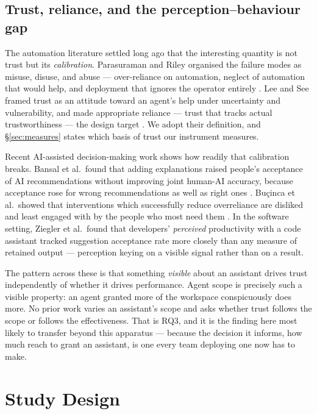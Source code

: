 \documentclass[acmsmall,review,screen]{acmart}
\begin{document}
\subsection{Trust, reliance, and the perception--behaviour gap}

The automation literature settled long ago that the interesting quantity is not
trust but its \emph{calibration}. Parasuraman and Riley organised the failure
modes as misuse, disuse, and abuse --- over-reliance on automation, neglect of
automation that would help, and deployment that ignores the operator entirely
\cite{parasuraman1997humans}. Lee and See framed trust as an attitude toward an
agent's help under uncertainty and vulnerability, and made appropriate reliance
--- trust that tracks actual trustworthiness --- the design target
\cite{lee2004trust}. We adopt their definition, and \S\ref{sec:measures} states
which basis of trust our instrument measures.

Recent AI-assisted decision-making work shows how readily that calibration
breaks. Bansal et al.\ found that adding explanations raised people's acceptance
of AI recommendations without improving joint human-AI accuracy, because
acceptance rose for wrong recommendations as well as right ones
\cite{bansal2021whole}. Bu\c{c}inca et al.\ showed that interventions which
successfully reduce overreliance are disliked and least engaged with by the
people who most need them \cite{bucinca2021trust}. In the software setting,
Ziegler et al.\ found that developers' \emph{perceived} productivity with a code
assistant tracked suggestion acceptance rate more closely than any measure of
retained output \cite{ziegler2022productivity} --- perception keying on a visible
signal rather than on a result.

The pattern across these is that something \emph{visible} about an assistant
drives trust independently of whether it drives performance. Agent scope is
precisely such a visible property: an agent granted more of the workspace
conspicuously does more. No prior work varies an assistant's scope and asks
whether trust follows the scope or follows the effectiveness. That is RQ3, and
it is the finding here most likely to transfer beyond this apparatus --- because
the decision it informs, how much reach to grant an assistant, is one every team
deploying one now has to make.

\section{Study Design}\label{sec:design}
\end{document}
